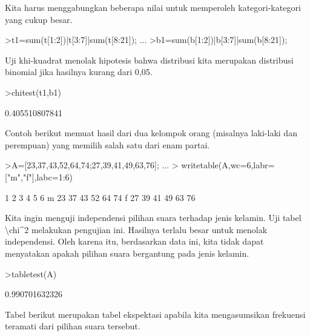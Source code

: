 \documentclass{article}
\newenvironment{eulernotebook}{\par}{\par}
\newenvironment{eulercomment}{\par\medskip}{\par\medskip}
\begin{document}
\begin{eulernotebook}
\begin{eulercomment}
Kita harus menggabungkan beberapa nilai untuk memperoleh
kategori-kategori yang cukup besar.
\end{eulercomment}
\begin{eulerprompt}
>t1=sum(t[1:2])|t[3:7]|sum(t[8:21]); ...
>b1=sum(b[1:2])|b[3:7]|sum(b[8:21]);
\end{eulerprompt}
\begin{eulercomment}
Uji khi-kuadrat menolak hipotesis bahwa distribusi kita merupakan
distribusi binomial jika hasilnya kurang dari 0,05.
\end{eulercomment}
\begin{eulerprompt}
>chitest(t1,b1)
\end{eulerprompt}
\begin{euleroutput}
  0.405510807841
\end{euleroutput}
\begin{eulercomment}
Contoh berikut memuat hasil dari dua kelompok orang (misalnya
laki-laki dan perempuan) yang memilih salah satu dari enam partai.
\end{eulercomment}
\begin{eulerprompt}
>A=[23,37,43,52,64,74;27,39,41,49,63,76];  ...
>  writetable(A,wc=6,labr=["m","f"],labc=1:6)
\end{eulerprompt}
\begin{euleroutput}
             1     2     3     4     5     6
       m    23    37    43    52    64    74
       f    27    39    41    49    63    76
\end{euleroutput}
\begin{eulercomment}
Kita ingin menguji independensi pilihan suara terhadap jenis kelamin.
Uji tabel \textdollar{}\textbackslash{}chi\textasciicircum{}2\textdollar{} melakukan pengujian ini. Hasilnya terlalu besar
untuk menolak independensi. Oleh karena itu, berdasarkan data ini,
kita tidak dapat menyatakan apakah pilihan suara bergantung pada jenis
kelamin.
\end{eulercomment}
\begin{eulerprompt}
>tabletest(A)
\end{eulerprompt}
\begin{euleroutput}
  0.990701632326
\end{euleroutput}
\begin{eulercomment}
Tabel berikut merupakan tabel ekspektasi apabila kita mengasumsikan
frekuensi teramati dari pilihan suara tersebut.
\end{eulercomment}
\begin{eulerprompt}

\end{eulerprompt}
\end{eulernotebook}
\end{document}
